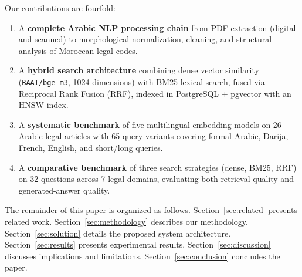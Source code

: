 Our contributions are fourfold:
\begin{enumerate}
  \item A \textbf{complete Arabic NLP processing chain} from PDF extraction
        (digital and scanned) to morphological normalization, cleaning, and
        structural analysis of Moroccan legal codes.
  \item A \textbf{hybrid search architecture} combining dense vector
        similarity (\texttt{BAAI/bge-m3}, 1024 dimensions) with BM25 lexical
        search, fused via Reciprocal Rank Fusion (RRF), indexed in
        PostgreSQL + pgvector with an HNSW index.
  \item A \textbf{systematic benchmark} of five multilingual embedding models
        on 26 Arabic legal articles with 65 query variants covering formal
        Arabic, Darija, French, English, and short/long queries.
  \item A \textbf{comparative benchmark} of three search strategies (dense,
        BM25, RRF) on 32 questions across 7 legal domains, evaluating both
        retrieval quality and generated-answer quality.
\end{enumerate}

The remainder of this paper is organized as follows. Section~\ref{sec:related}
presents related work. Section~\ref{sec:methodology} describes our
methodology. Section~\ref{sec:solution} details the proposed system
architecture. Section~\ref{sec:results} presents experimental results.
Section~\ref{sec:discussion} discusses implications and limitations.
Section~\ref{sec:conclusion} concludes the paper.
